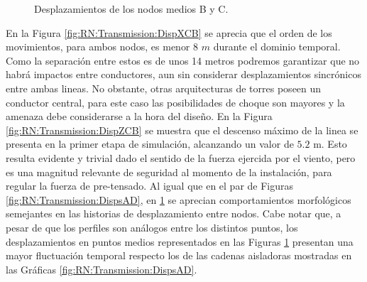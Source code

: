 \begingroup
\centering
\begin{figure}[htbp]
	\centering
	\caption{Desplazamientos de los nodos medios B y C. \label{fig:RN:Transmission:DispsCB}}
\end{figure}
\endgroup

En la Figura \ref{fig:RN:Transmission:DispXCB} se aprecia que el orden de los movimientos, para ambos nodos, es menor 8 $m$ durante el dominio temporal. Como la separación entre estos es de unos 14 metros podremos garantizar que no habrá impactos entre conductores, aun sin considerar desplazamientos sincrónicos entre ambas lineas. No obstante, otras arquitecturas de torres poseen un conductor central, para este caso las posibilidades de choque son mayores y la amenaza debe considerarse a la hora del diseño. En la Figura \ref{fig:RN:Transmission:DispZCB} se muestra que el descenso máximo de la linea se presenta en la primer etapa de simulación, alcanzando un valor de $5.2$ m. Esto resulta evidente y trivial dado el sentido de la fuerza ejercida por el viento, pero es una magnitud relevante de seguridad al momento de la instalación, para regular la fuerza de pre-tensado. Al igual que en el par de Figuras \ref{fig:RN:Transmission:DispsAD}, en \ref{fig:RN:Transmission:DispsCB} se aprecian comportamientos morfológicos semejantes en las historias de desplazamiento entre nodos. Cabe notar que, a pesar de que los perfiles son análogos entre los distintos puntos, los desplazamientos en puntos medios representados en las Figuras \ref{fig:RN:Transmission:DispsCB} presentan una mayor fluctuación temporal respecto los de las cadenas aisladoras mostradas en las Gráficas \ref{fig:RN:Transmission:DispsAD}.

